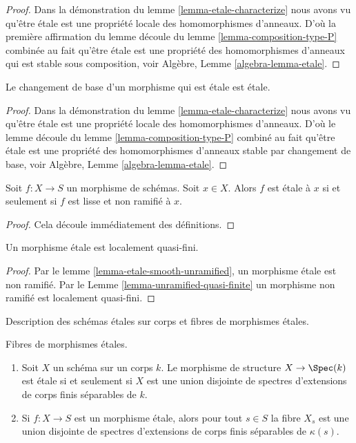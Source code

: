 \begin{proof}
Dans la démonstration du lemme \ref{lemma-etale-characterize} nous avons vu
qu'être étale est une propriété locale des homomorphismes
d'anneaux. D'où la première affirmation du
lemme découle du lemme \ref{lemma-composition-type-P} combinée au fait
qu'être étale est une propriété des homomorphismes d'anneaux
qui est stable sous composition,
voir Algèbre, Lemme \ref{algebra-lemma-etale}.
\end{proof}

\begin{lemma}
\label{lemma-base-change-etale}
Le changement de base d'un morphisme qui est étale est étale.
\end{lemma}

\begin{proof}
Dans la démonstration du lemme \ref{lemma-etale-characterize} nous avons
vu qu'être étale est une propriété locale des homomorphismes
d'anneaux. D'où le
lemme découle du lemme \ref{lemma-composition-type-P} combiné au
fait qu'être étale est une propriété des homomorphismes d'anneaux
stable par changement
de base, voir Algèbre, Lemme \ref{algebra-lemma-etale}.
\end{proof}

\begin{lemma}
\label{lemma-etale-smooth-unramified}
Soit $f : X \to S$ un morphisme de schémas. Soit $x \in X$.
Alors $f$ est étale à $x$ si et seulement si $f$ est
lisse et non ramifié à $x$.
\end{lemma}

\begin{proof}
Cela découle immédiatement des définitions.
\end{proof}

\begin{lemma}
\label{lemma-etale-locally-quasi-finite}
Un morphisme étale est localement quasi-fini.
\end{lemma}

\begin{proof}
Par
le lemme \ref{lemma-etale-smooth-unramified}, un morphisme
étale est non ramifié.
Par le Lemme \ref{lemma-unramified-quasi-finite} un morphisme
non ramifié est localement quasi-fini.
\end{proof}

\begin{lemma}
\label{lemma-etale-over-field}
\begin{slogan}
Description des schémas étales sur corps et fibres de morphismes
étales.
\end{slogan}
Fibres de morphismes étales.
\begin{enumerate}
\item Soit $X$ un schéma sur un corps $k$.
Le morphisme de structure $X \to \Spec(k)$ est étale si et seulement
si $X$ est une union disjointe de spectres d'extensions de corps finis
séparables de $k$.
\item Si $f : X \to S$ est un morphisme étale, alors pour tout $s \in S$ la fibre
$X_s$ est une union disjointe de spectres d'extensions de corps finis
séparables de $\kappa(s)$.
\end{enumerate}
\end{lemma}

